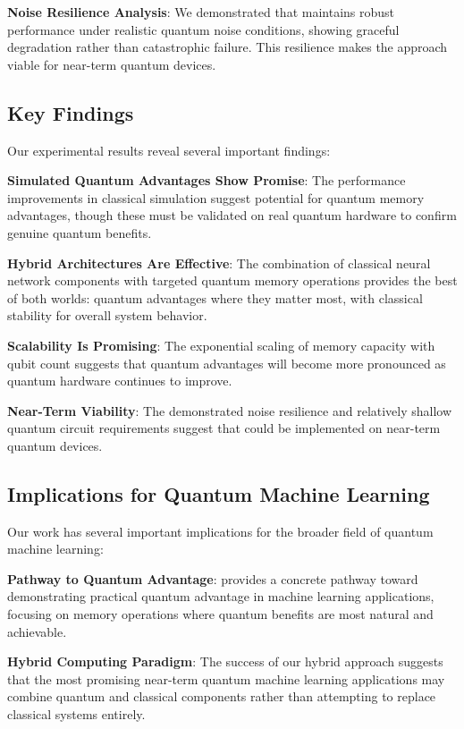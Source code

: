 \textbf{Noise Resilience Analysis}: We demonstrated that \qmann maintains robust performance under realistic quantum noise conditions, showing graceful degradation rather than catastrophic failure. This resilience makes the approach viable for near-term quantum devices.

\subsection{Key Findings}

Our experimental results reveal several important findings:

\textbf{Simulated Quantum Advantages Show Promise}: The performance improvements in classical simulation suggest potential for quantum memory advantages, though these must be validated on real quantum hardware to confirm genuine quantum benefits.

\textbf{Hybrid Architectures Are Effective}: The combination of classical neural network components with targeted quantum memory operations provides the best of both worlds: quantum advantages where they matter most, with classical stability for overall system behavior.

\textbf{Scalability Is Promising}: The exponential scaling of memory capacity with qubit count suggests that quantum advantages will become more pronounced as quantum hardware continues to improve.

\textbf{Near-Term Viability}: The demonstrated noise resilience and relatively shallow quantum circuit requirements suggest that \qmann could be implemented on near-term quantum devices.

\subsection{Implications for Quantum Machine Learning}

Our work has several important implications for the broader field of quantum machine learning:

\textbf{Pathway to Quantum Advantage}: \qmann provides a concrete pathway toward demonstrating practical quantum advantage in machine learning applications, focusing on memory operations where quantum benefits are most natural and achievable.

\textbf{Hybrid Computing Paradigm}: The success of our hybrid approach suggests that the most promising near-term quantum machine learning applications may combine quantum and classical components rather than attempting to replace classical systems entirely.

